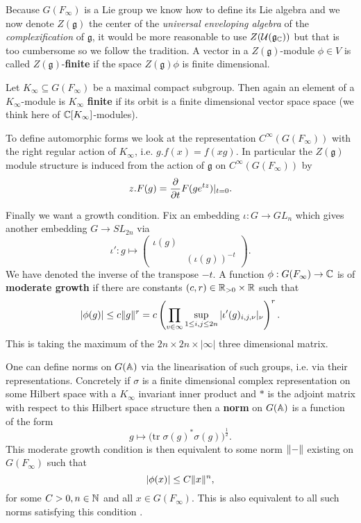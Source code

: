     Because \(G(F_\infty)\) is a Lie group we know how to define its Lie algebra and we now denote \(Z(\mathfrak{g})\) the center of the \textit{universal enveloping algebra} of the \textit{complexification} of \(\mathfrak{g}\), it would be more reasonable to use \(Z(\mathcal{U}(\mathfrak{g}_{\C}))\) but that is too cumbersome so we follow the tradition. 
    A vector in a \(Z(\mathfrak{g})\)-module \(\phi\in V\) is called \(Z(\mathfrak{g})\)-\textbf{finite} if the space \(Z(\mathfrak{g})\phi\) is finite dimensional. 

	Let \(K_\infty\subseteq  G(F_\infty)\) be a maximal compact subgroup. Then again an element of a \(K_\infty\)-module is \(K_\infty\) \textbf{finite} if its orbit is a finite dimensional vector space space (we think here of \(\C[K_\infty]\)-modules).

	To define automorphic forms we look at the representation \(C^\infty(G(F_\infty))\) with the right regular action of \(K_\infty\), i.e. \(g.f(x) = f(xg)\).  In particular the \(Z(\mathfrak{g})\) module structure is induced from the action of \(\mathfrak{g}\) on \(C^\infty(G(F_\infty))\) by \label{lie_algebra_action}
	\[z.F(g) = \frac{\partial }{\partial t}F(ge^{tz})|_{t=0}.\] 
	
	Finally we want a growth condition. Fix an embedding \(\iota : G\to GL_n\) which gives another embedding \(G\to SL_{2n}\) via
	\[\iota': g\mapsto \begin{pmatrix}
		\iota (g) & \\
		& (\iota (g))^{-t}
	\end{pmatrix}.\]
	We have denoted the inverse of the transpose \(-t\). A function \(\phi : G(F_\infty) \to \C \) is of \textbf{moderate growth} if there are constants \((c,r)\in \R_{>0}\times \R\) such that 
	\[|\phi(g)| \leq c\norm{g}^r = c \left(\prod_{v\in\infty} \sup_{1\leq i, j\leq 2n} |\iota' (g)_{i,j, \nu}|_\nu\right)^r.\]
	This is taking the maximum of the \(2n\times 2n \times |\infty| \) three dimensional matrix. 

	\begin{remark}
		One can define norms on \(G(\A)\) via the linearisation of such groups, i.e. via their representations. Concretely if \(\sigma\) is a finite dimensional complex representation on some Hilbert space with a \(K_\infty\) invariant inner product and \(\ast\) is the adjoint matrix with respect to this Hilbert space structure then a \textbf{norm} on \(G(\A)\) is a function of the form
		\[g\mapsto \big(\mathrm{tr }\; \sigma(g)^*\sigma(g)\big)^{\frac{1}{2}}.\]
		This moderate growth condition is then equivalent to some norm \(\lVert  -  \rVert\) existing on \(G(F_\infty)\) such that 
		\[|\phi(x)| \leq C\norm{x}^n,\]
		for some \(C>0, n\in \N\) and all \(x\in G(F_\infty)\). This is also equivalent to all such norms satisfying this condition \cite[1.2]{borelAutomorphicFormsRepresentations1979}.
	\end{remark}

